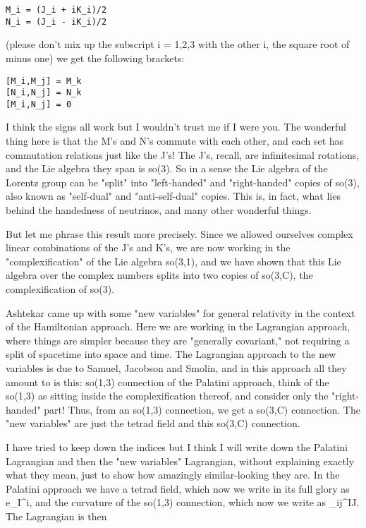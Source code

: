 \begin{verbatim}
M_i = (J_i + iK_i)/2
N_i = (J_i - iK_i)/2
\end{verbatim}
    

(please don't mix up the subscript i = 1,2,3 with the other i, the
square root of minus one) we get the following brackets:

\begin{verbatim}
[M_i,M_j] = M_k
[N_i,N_j] = N_k
[M_i,N_j] = 0
\end{verbatim}
    

I think the signs all work but I wouldn't trust me if I were you.  
The wonderful thing here is that the M's and N's commute with each
other, and each set has commutation relations just like the J's!  The
J's, recall, are infinitesimal rotations, and the Lie algebra they span
is so(3).  So in a sense the Lie algebra of the Lorentz group can
be "split" into "left-handed" and "right-handed" copies of so(3), also
known as "self-dual" and "anti-self-dual" copies.  This is, in fact,
what lies behind the handedness of neutrinos, and many other wonderful
things.  

But let me phrase this result more precisely.  Since we allowed
ourselves complex linear combinations of the J's and K's, we are now
working in the "complexification" of the Lie algebra so(3,1), and we
have shown that this Lie algebra over the complex numbers splits into
two copies of so(3,C), the complexification of so(3).  

Ashtekar came up with some "new variables" for general relativity in the
context of the Hamiltonian approach.  Here we are working in the
Lagrangian approach, where things are simpler because they are
"generally covariant," not requiring a split of spacetime into space and
time.  The Lagrangian approach to the new variables is due to Samuel,
Jacobson and Smolin, and in this approach all they amount to is this:
so(1,3) connection of the Palatini approach, think of the so(1,3) as
sitting inside the complexification thereof, and consider only the
"right-handed" part!  Thus, from an so(1,3) connection, we get a so(3,C)
connection.  The "new variables" are just the tetrad field and this
so(3,C) connection.  

I have tried to keep down the indices but I think I will write down the
Palatini Lagrangian and then the "new variables" Lagrangian, without
explaining exactly what they mean, just to show how amazingly
similar-looking they are.  In the Palatini approach we have a tetrad
field, which now we write in its full glory as e_I^i, and the curvature
of the so(1,3) connection, which now we write as \Omega _{ij}^{IJ}.  The
Lagrangian is then

